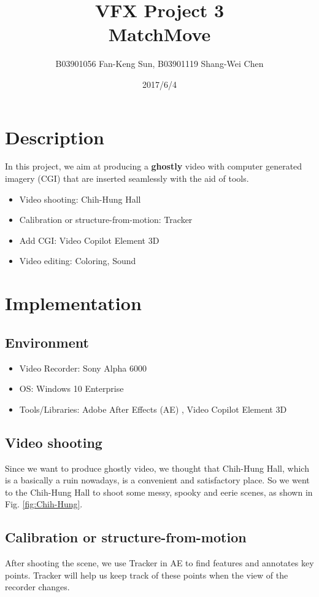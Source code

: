 \documentclass[11pt]{article}
\title{\bf{VFX Project 3\\\large{MatchMove}}\vspace{-10pt}}
\author{B03901056 Fan-Keng Sun, B03901119 Shang-Wei Chen}
\date{2017/6/4}
\begin{document}
\maketitle
\section{Description}
In this project, we aim at producing a \textbf{ghostly} video with computer generated imagery (CGI) that are inserted seamlessly with the aid of tools.
\begin{itemize}
  \itemsep=0pt
  \item Video shooting: Chih-Hung Hall
  \item Calibration or structure-from-motion: Tracker
  \item Add CGI: Video Copilot Element 3D
  \item Video editing: Coloring, Sound
\end{itemize}
\section{Implementation}
\subsection{Environment}
\begin{itemize}
  \itemsep=0pt
  \item Video Recorder: Sony Alpha 6000
  \item OS: Windows 10 Enterprise
  \item Tools/Libraries: Adobe After Effects (AE) \cite{ref:AE}, Video Copilot Element 3D \cite{ref:copilot}
\end{itemize}

\subsection{Video shooting}
Since we want to produce ghostly video, we thought that Chih-Hung Hall, which is a basically a ruin nowadays, is a convenient and satisfactory place. So we went to the Chih-Hung Hall to shoot some messy, spooky and eerie scenes, as shown in Fig. \ref{fig:Chih-Hung}.
\subsection{Calibration or structure-from-motion}
After shooting the scene, we use Tracker in AE to find features and annotates key points. Tracker will help us keep track of these points when the view of the recorder changes.
\end{document}
